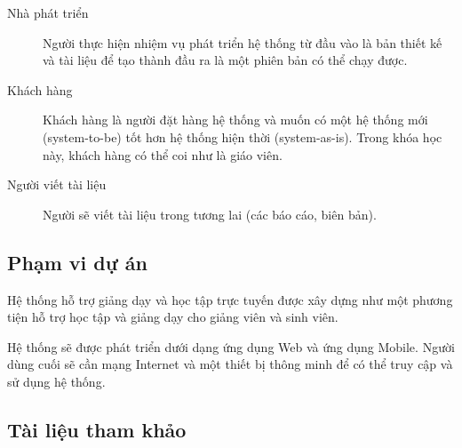 \documentclass[./../main_file.tex]{subfiles}
\begin{document}
	\begin{description}
		\item [Nhà phát triển] Người thực hiện nhiệm vụ phát triển hệ thống từ đầu vào là bản thiết kế và tài liệu để tạo thành đầu ra là một phiên bản có thể chạy được.
		\item [Khách hàng] Khách hàng là người đặt hàng hệ thống và muốn có một hệ thống mới (system-to-be) tốt hơn hệ thống hiện thời (system-as-is). Trong khóa học này, khách hàng có thể coi như là giáo viên.
		\item [Người viết tài liệu] Người sẽ viết tài liệu trong tương lai (các báo cáo, biên bản).
	\end{description}

	\subsection{Phạm vi dự án}
	Hệ thống hỗ trợ giảng dạy và học tập trực tuyến được xây dựng như một phương tiện hỗ trợ học tập và giảng dạy cho giảng viên và sinh viên.
	
	
	Hệ thống sẽ được phát triển dưới dạng ứng dụng Web và ứng dụng Mobile. Người dùng cuối sẽ cần mạng Internet và một thiết bị thông minh để có thể truy cập và sử dụng hệ thống. 
	

	
	\subsection{Tài liệu tham khảo}
	\nocite{*}
	\printbibliography[heading=none]
	
\end{document}
